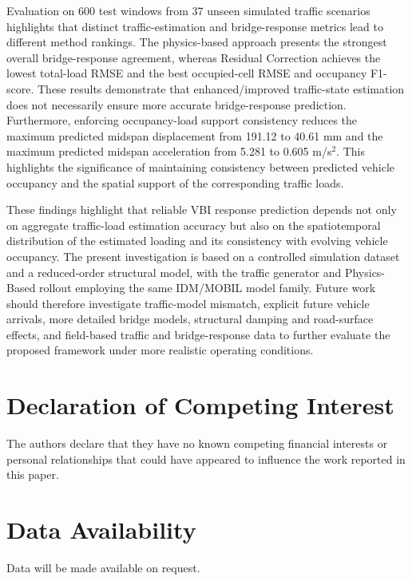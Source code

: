 \documentclass[journal]{IEEEtran}
\begin{document}
Evaluation on 600 test windows from 37 unseen simulated traffic scenarios highlights that distinct traffic-estimation and bridge-response metrics lead to different method rankings. The physics-based approach presents the strongest overall bridge-response agreement, whereas Residual Correction achieves the lowest total-load RMSE and the best occupied-cell RMSE and occupancy F1-score. These results demonstrate that enhanced/improved traffic-state estimation does not necessarily ensure more accurate bridge-response prediction. Furthermore, enforcing occupancy-load support consistency reduces the maximum predicted midspan displacement from 191.12 to 40.61 mm and the maximum predicted midspan acceleration from 5.281 to 0.605 m/s$^2$. This highlights the significance of maintaining consistency between predicted vehicle occupancy and the spatial support of the corresponding traffic loads.

These findings highlight that reliable VBI response prediction depends not only on aggregate traffic-load estimation accuracy but also on the spatiotemporal distribution of the estimated loading and its consistency with evolving vehicle occupancy. The present investigation is based on a controlled simulation dataset and a reduced-order structural model, with the traffic generator and Physics-Based rollout employing the same IDM/MOBIL model family. Future work should therefore investigate traffic-model mismatch, explicit future vehicle arrivals, more detailed bridge models, structural damping and road-surface effects, and field-based traffic and bridge-response data to further evaluate the proposed framework under more realistic operating conditions.

\section*{Declaration of Competing Interest}

The authors declare that they have no known competing financial interests or personal relationships that could have appeared to influence the work reported in this paper.

\section*{Data Availability}

Data will be made available on request.

\FloatBarrier


\end{document}
